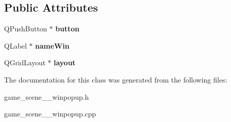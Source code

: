 \subsection*{Public Attributes}
\begin{DoxyCompactItemize}
\item 
\hypertarget{classgame__scene__1__winpopup_a90e1eccc4b44dcc146b454dbfe2dcf1c}{Q\-Push\-Button $\ast$ {\bfseries button}}\label{classgame__scene__1__winpopup_a90e1eccc4b44dcc146b454dbfe2dcf1c}

\item 
\hypertarget{classgame__scene__1__winpopup_a9463ad35ddef4758e11a2dfabbb95a4a}{Q\-Label $\ast$ {\bfseries name\-Win}}\label{classgame__scene__1__winpopup_a9463ad35ddef4758e11a2dfabbb95a4a}

\item 
\hypertarget{classgame__scene__1__winpopup_a103d46e5dec4d5c145371fcd2464a4b7}{Q\-Grid\-Layout $\ast$ {\bfseries layout}}\label{classgame__scene__1__winpopup_a103d46e5dec4d5c145371fcd2464a4b7}

\end{DoxyCompactItemize}


The documentation for this class was generated from the following files\-:\begin{DoxyCompactItemize}
\item 
game\-\_\-scene\-\_\-\_\-winpopup.\-h\item 
game\-\_\-scene\-\_\-\_\-winpopup.\-cpp\end{DoxyCompactItemize}
